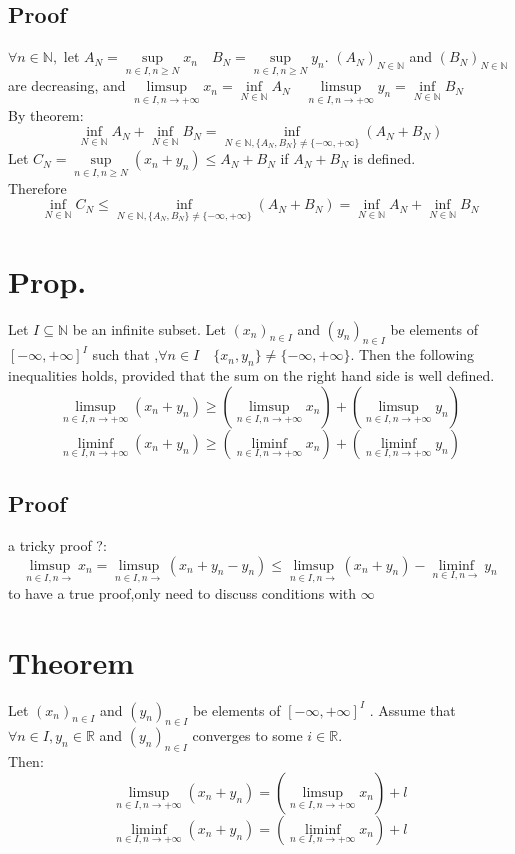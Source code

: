 \documentclass{book}
\begin{document}
\subsection*{Proof}
$\forall n\in\mathbb{N} ,$ let $A_N=\sup\limits_{n\in I,n\geq N}x_n\quad B_N=\sup\limits_{n\in I,n\geq N}y_n$. $(A_N)_{N\in \mathbb{N} }$ and $(B_N)_{N\in \mathbb{N} }$ are decreasing, and $\limsup\limits_{n\in I,n\rightarrow+\infty}x_n=\inf\limits_{N\in \mathbb{N} }A_N\quad\limsup\limits_{n\in I,n\rightarrow+\infty}y_n=\inf\limits_{N\in \mathbb{N} }B_N$\\
By theorem:
$$\inf\limits_{N\in \mathbb{N} }A_N+\inf\limits_{N\in \mathbb{N} }B_N=\inf\limits_{N\in \mathbb{N},\{A_N,B_N\}\not=\{-\infty,+\infty\} }(A_N+B_N)$$
Let $C_N=\sup\limits_{n\in I,n\geq N}(x_n+y_n)\leq A_N+B_N$ if $A_N+B_N$ is defined.\\
Therefore $$\inf\limits_{N\in \mathbb{N} }C_N\leq\inf\limits_{N\in \mathbb{N},\{A_N,B_N\}\not=\{-\infty,+\infty\} }(A_N+B_N)=\inf\limits_{N\in \mathbb{N} }A_N+\inf\limits_{N\in \mathbb{N} }B_N$$
\section{Prop.}
Let $I\subseteq\mathbb{N} $ be an infinite subset. Let $(x_n)_{n\in I}$ and $(y_n)_{n\in I}$ be elements of $[-\infty,+\infty]^I$ such that ,$\forall n\in I\quad \{x_n,y_n\}\not=\{-\infty,+\infty\}$. Then the following inequalities holds, provided that the sum on the right hand side is well defined.
$$\limsup\limits_{n\in I,n\rightarrow+\infty}(x_n+y_n)\geq(\limsup\limits_{n\in I,n\rightarrow+\infty}x_n)+(\limsup\limits_{n\in I,n\rightarrow+\infty}y_n)$$
$$\liminf\limits_{n\in I,n\rightarrow+\infty}(x_n+y_n)\geq(\liminf\limits_{n\in I,n\rightarrow+\infty}x_n)+(\liminf\limits_{n\in I,n\rightarrow+\infty}y_n)$$
\subsection*{Proof}
a tricky proof ?:
$$\limsup\limits_{n\in I,n\rightarrow}x_n=\limsup\limits_{n\in I,n\rightarrow}(x_n+y_n-y_n)\leq\limsup\limits_{n\in I,n\rightarrow}(x_n+y_n)-\liminf\limits_{n\in I,n\rightarrow}y_n$$
to have a true proof,only need to discuss conditions with $\infty$
\section{Theorem}
Let $(x_n)_{n\in I}$ and $(y_n)_{n\in I}$ be elements of $[-\infty,+\infty]^I$ . Assume that $\forall n\in I,y_n\in\mathbb{R} $ and $(y_n)_{n\in I}$ converges to some $i\in \mathbb{R} $.\\Then:
$$\limsup\limits_{n\in I,n\rightarrow+\infty}(x_n+y_n)=(\limsup\limits_{n\in I,n\rightarrow+\infty}x_n)+l$$
$$\liminf\limits_{n\in I,n\rightarrow+\infty}(x_n+y_n)=(\liminf\limits_{n\in I,n\rightarrow+\infty}x_n)+l$$
\end{document}
